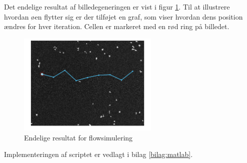 Det endelige resultat af billedegeneringen er vist i figur \ref{fig:finalresult}. Til at illustrere hvordan øen flytter sig er der tilføjet en graf, som viser hvordan dens position ændres for hver iteration. Cellen er markeret med en rød ring på billedet.

\begin{figure}[H]
	\centering
	\includegraphics[width=0.6\textwidth]{billeder/software/final.png}
	\caption{Endelige resultat for flowsimulering}
	\label{fig:finalresult}
\end{figure}

Implementeringen af scriptet er vedlagt i bilag \ref{bilag:matlab}.